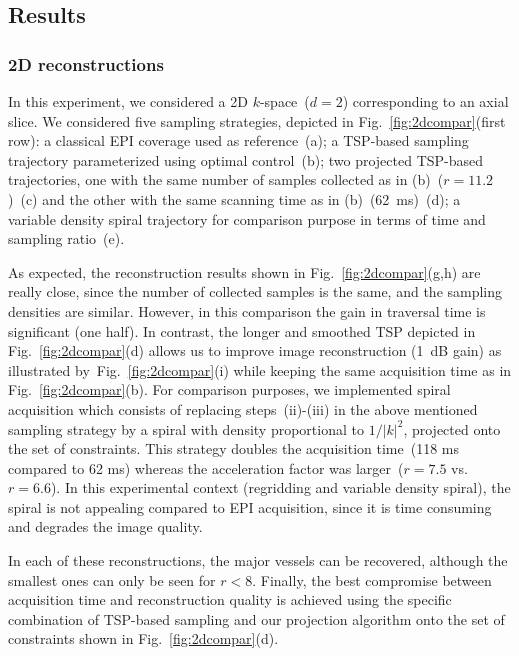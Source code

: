 \documentclass{article}
\begin{document}
\subsection{Results}

\subsubsection{2D reconstructions}
\vspace*{-.02 \linewidth}
In this experiment, we considered a 2D $k$-space~($d=2$) corresponding to an axial slice. We considered five sampling strategies, depicted in Fig.~\ref{fig:2dcompar}(first row): a classical EPI coverage used as reference~(a); a TSP-based sampling trajectory parameterized using optimal control~(b); two projected TSP-based trajectories, one with the same number of samples collected as in (b)~($r=11.2$)~(c) and the other with the same scanning time as in (b)~(62~ms)~(d); a variable density spiral trajectory for comparison purpose in terms of time and sampling ratio~(e).

As expected, the reconstruction results shown in Fig.~\ref{fig:2dcompar}(g,h) are really close, since the number of collected samples is the same, and the sampling densities are similar. However, in this comparison the gain in traversal time is significant (one half). In contrast, the longer and smoothed TSP depicted in Fig.~\ref{fig:2dcompar}(d) allows us to improve image reconstruction (1~dB gain) as illustrated by~Fig.~\ref{fig:2dcompar}(i) while keeping the same acquisition time as in Fig.~\ref{fig:2dcompar}(b). 
For comparison purposes, we implemented spiral acquisition which consists of replacing steps~(ii)-(iii) in the above mentioned sampling strategy by a spiral with density proportional to $1/|k|^2$, projected onto the set of constraints. This strategy doubles the acquisition time~(118 ms compared to 62 ms) whereas the acceleration factor was larger~($r=7.5$ vs. $r=6.6$). In this experimental context (regridding and variable density spiral), the spiral is not appealing compared to EPI acquisition, since it is time consuming and degrades the image quality.

In each of these reconstructions, the major vessels can be recovered, although the smallest ones can only be seen for $r<8$. Finally, the best compromise between acquisition time and reconstruction quality is achieved using the specific combination of TSP-based sampling and our projection algorithm onto the set of constraints shown in Fig.~\ref{fig:2dcompar}(d).
\end{document}
